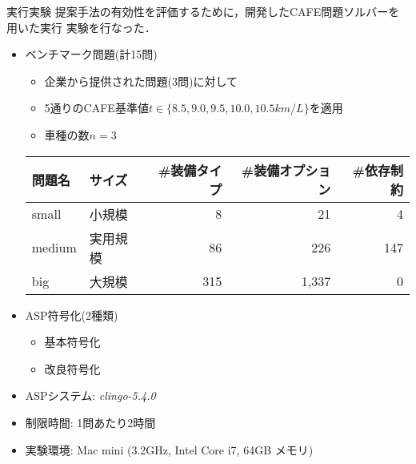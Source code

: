 \documentclass[dvipdfmx, 11pt]{beamer}
\begin{document}
\begin{frame}{実行実験}
提案手法の有効性を評価するために，開発したCAFE問題ソルバーを用いた実行
実験を行なった．
\vfill
\begin{itemize}
\item ベンチマーク問題(計15問)
  \begin{itemize}
  \item 企業から提供された問題(3問)に対して
  \item 5通りのCAFE基準値$t\in\{8.5, 9.0, 9.5, 10.0, 10.5km/L\}$を適用
  \item 車種の数$n = 3$
  \end{itemize}
  \begin{exampleblock}\small
    \centering
    \begin{tabular}{ ll|r r r }
      問題名 & サイズ &  \#装備タイプ & \#装備オプション& \#依存制約\\ \hline
      small	 & 小規模   &   8 &   21  &   4	\\
      medium & 実用規模 &  86 &  226  & 147	\\
      big    & 大規模   & 315 & 1,337 &   0
    \end{tabular}
  \end{exampleblock}
\item ASP符号化(2種類)
      \begin{itemize}
       \item 基本符号化
       \item 改良符号化
      \end{itemize}
\item ASPシステム: \textit{clingo-5.4.0}
\item 制限時間: 1問あたり2時間
\item 実験環境: Mac mini (3.2GHz, Intel Core i7, 64GB メモリ)
\end{itemize}
\end{frame}
\end{document}
